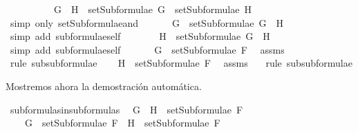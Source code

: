 \begin{isabellebody}
\ \ \ \ \ \ \ \ \ \ {\isacharbraceleft}G\ \isactrlbold {\isasymand}\ H{\isacharbraceright}\ {\isasymunion}\ {\isacharparenleft}setSubformulae\ G\ {\isasymunion}\ setSubformulae\ H{\isacharparenright}{\isachardoublequoteclose}\ \isanewline
\ \ \ \ \isamarkupfalse%
\ {\isacharparenleft}simp\ only{\isacharcolon}\ setSubformulae{\isacharunderscore}and{\isacharparenright}\isanewline
\ \ \isamarkupfalse%
\ \isamarkupfalse%
\ {}{\isacharcolon}\ {\isachardoublequoteopen}G\ {\isasymin}\ setSubformulae\ {\isacharparenleft}G\ \isactrlbold {\isasymand}\ H{\isacharparenright}{\isachardoublequoteclose}\ \isanewline
\ \ \ \ \isamarkupfalse%
\ {\isacharparenleft}simp\ add{\isacharcolon}\ subformulae{\isacharunderscore}self{\isacharparenright}\ %
\ \isanewline
\ \ \isamarkupfalse%
\ {}{\isacharcolon}\ {\isachardoublequoteopen}H\ {\isasymin}\ setSubformulae\ {\isacharparenleft}G\ \isactrlbold {\isasymand}\ H{\isacharparenright}{\isachardoublequoteclose}\ \isanewline
\ \ \ \ \isamarkupfalse%
\ {}\ \isanewline
\ \ \ \ \isamarkupfalse%
\ {\isacharparenleft}simp\ add{\isacharcolon}\ subformulae{\isacharunderscore}self{\isacharparenright}\ %
\ \isanewline
\ \ \isamarkupfalse%
\ {\isachardoublequoteopen}G\ {\isasymin}\ setSubformulae\ F{\isachardoublequoteclose}\ \isamarkupfalse%
\ assms\ {}\ \isamarkupfalse%
\ {\isacharparenleft}rule\ subsubformulae{\isacharparenright}\isanewline
\ \ \isamarkupfalse%
\ {\isachardoublequoteopen}H\ {\isasymin}\ setSubformulae\ F{\isachardoublequoteclose}\ \isamarkupfalse%
\ assms\ {}\ \isamarkupfalse%
\ {\isacharparenleft}rule\ subsubformulae{\isacharparenright}\isanewline
{}\isamarkupfalse%
%
\endisatagproof
{\isafoldproof}%
%
\isadelimproof
%
\endisadelimproof
%
\begin{isamarkuptext}%
Mostremos ahora la demostración automática.%
\end{isamarkuptext}\isamarkuptrue%
\isamarkupfalse%
\ subformulas{\isacharunderscore}in{\isacharunderscore}subformulas{\isacharcolon}\isanewline
\ \ {\isachardoublequoteopen}G\ \isactrlbold {\isasymand}\ H\ {\isasymin}\ setSubformulae\ F\ \isanewline
\ \ \ {\isasymLongrightarrow}\ G\ {\isasymin}\ setSubformulae\ F\ {\isasymand}\ H\ {\isasymin}\ setSubformulae\ F{\isachardoublequoteclose}\isanewline

\end{isabellebody}
